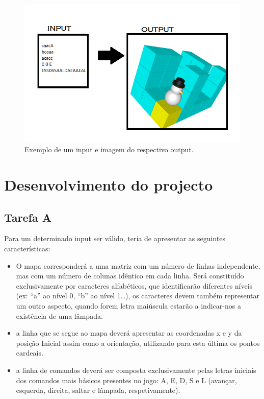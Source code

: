 \documentclass[a4paper,12pt]{report}
\begin{document}
\begin{figure}[!h]
\centering
\includegraphics[scale=0.45]{./RELATORIOEX8.png}
\caption{Exemplo de um input e imagem do respectivo output.}
\end{figure}

\chapter{Desenvolvimento do projecto}

\section{Tarefa A}
Para um determinado input ser válido, teria de apresentar as seguintes características: 

\begin{itemize}
\item O mapa corresponderá a uma matriz com um número de linhas independente, mas com um número de colunas idêntico em cada linha. Será constituído exclusivamente por caracteres alfabéticos, que identificarão diferentes níveis (ex: “a” ao nível 0, “b” ao nível 1…), os caracteres devem também representar um outro aspecto, quando forem letra maiúscula estarão a indicar-nos a existência de uma lâmpada. 
\item a linha que se segue ao mapa deverá apresentar as coordenadas x e y da posição Inicial assim como a orientação, utilizando para esta última os pontos cardeais.
\item a linha de comandos deverá ser composta exclusivamente pelas letras iniciais dos comandos mais básicos presentes no jogo: A, E, D, S e L (avançar, esquerda, direita, saltar e lâmpada, respetivamente).
\end{itemize}
\end{document}
